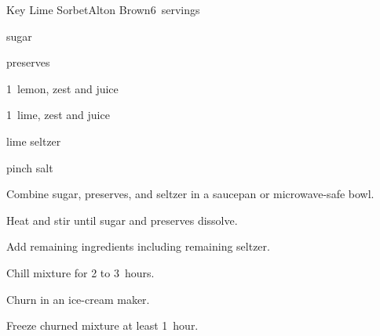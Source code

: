 \begin{recipe}{Key Lime Sorbet}{Alton Brown}{6~servings}

\begin{ingredients}
\item {} sugar
\item {}  preserves
\item 1~lemon, zest and juice
\item 1~lime, zest and juice
\item {} lime seltzer
\item pinch salt
\end{ingredients}

\begin{directions}
\item Combine sugar, preserves, and  seltzer in a saucepan or microwave-safe bowl.
\item Heat and stir until sugar and preserves dissolve.
\item Add remaining ingredients including remaining seltzer.
\item Chill mixture for 2 to 3~hours.
\item Churn in an ice-cream maker.
\item Freeze churned mixture at least 1~hour.
\end{directions}

\end{recipe}

